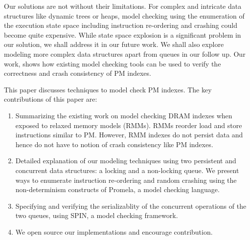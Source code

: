 Our solutions are not without their limitations. For complex and intricate data
structures like dynamic trees or heaps, model checking using the enumeration of
the execution state space including instruction re-ordering and crashing could
become quite expensive. While state space explosion is a significant problem
in our solution, we shall address it in our future work. We shall also explore
modeling more complex data structures apart from queues in our follow up. Our
work, shows how existing model checking tools can be used to verify the
correctness and crash consistency of PM indexes.

This paper discusses techniques to model check PM indexes. The key
contributions of this paper are:
\begin{enumerate}
    
    \item Summarizing the existing work on model checking DRAM indexes when
    exposed to relaxed memory models (RMMs). RMMs reorder load and store
    instructions similar to PM. However, RMM indexes do not persist data and
    hence do not have to notion of crash consistency like PM indexes.

    \item Detailed explanation of our modeling techniques using two persistent
    and concurrent data structures: a locking and a non-locking queue. We
    present ways to enumerate instruction re-ordering and random crashing using
    the non-determinism constructs of Promela, a model checking language.

    \item Specifying and verifying the serializablity of the concurrent
    operations of the two queues, using SPIN, a model checking framework.

    \item We open source our implementations and encourage contribution.

\end{enumerate}
